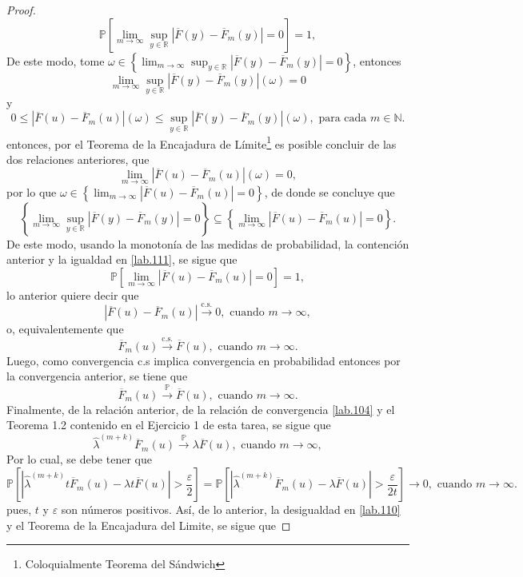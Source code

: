 \documentclass[10.5pt,notitlepage]{article}
\newcommand{\PP}{\mathbb{P}}
\newcommand{\RR}{\mathbb{R}}
\newcommand{\ee}{\varepsilon}
\newcommand{\NN}{\mathbb{N}}
\newcommand{\toPP}{\overset{\PP}{\to}}
\newcommand{\toCS}{\overset{\mathrm{c.s.}}{\to}}
\newcommand{\abs}[1]{\left\lvert #1 \right\rvert}
\newcommand{\corch}[1]{\left[ #1 \right]}
\newcommand{\kis}[1]{\left\{ #1 \right\}}
\theoremstyle{plain}
\begin{document}
\begin{proof}
\begin{equation}\label{lab.111}
\PP\corch{\lim_{m \to \infty}\sup_{y \in \RR}\abs{\overline{F}(y) - \overline{F}_{m}(y)} = 0}= 1,     
\end{equation}
De este modo, tome \(\omega \in \kis{\lim_{m \to \infty}\sup_{y \in \RR}\abs{\overline{F}(y) - \overline{F}_{m}(y)} = 0}\), entonces 
\[
\lim_{m \to \infty}\sup_{y \in \RR}\abs{\overline{F}(y) - \overline{F}_{m}(y)}(\omega) = 0
\]
y
\[
0 \leq \abs{\overline{F}(u) - \overline{F}_{m}(u)}(\omega) \leq \sup_{y \in \RR}\abs{\overline{F}(y) - \overline{F}_{m}(y)}(\omega), \text{ para cada } m \in \NN.
\]
entonces, por el Teorema de la Encajadura de Límite\footnote{Coloquialmente Teorema del Sándwich} es posible concluir de las dos relaciones anteriores, que 
\[
 \lim_{m \to \infty}\abs{\overline{F}(u) - \overline{F}_{m}(u)}(\omega) = 0,
\]
por lo que \(\omega \in \kis{ \lim_{m \to \infty}\abs{\overline{F}(u) - \overline{F}_{m}(u)} = 0}\), de donde se concluye que 
\[
\kis{\lim_{m \to \infty}\sup_{y \in \RR}\abs{\overline{F}(y) - \overline{F}_{m}(y)} = 0}\subseteq \kis{\lim_{m \to \infty}\abs{\overline{F}(u) - \overline{F}_{m}(u)} = 0}.
\]
De este modo, usando la monotonía de las medidas de probabilidad, la contención anterior y la igualdad en \eqref{lab.111}, se sigue que 
\[
\PP\corch{\lim_{m \to \infty}\abs{\overline{F}(u) - \overline{F}_{m}(u)} = 0} = 1, 
\]
lo anterior quiere decir que 
\[
\abs{\overline{F}(u) - \overline{F}_{m}(u)} \toCS 0, \text{ cuando } m \to \infty,
\]
o, equivalentemente que 
\[
 \overline{F}_{m}(u) \toCS \overline{F}(u),  \text{ cuando } m \to \infty.
\]
Luego, como convergencia c.s implica convergencia en probabilidad entonces por la convergencia anterior, se tiene que
\begin{equation}\label{lab.12}
   \overline{F}_{m}(u) \toPP \overline{F}(u),  \text{ cuando } m \to \infty.  
\end{equation}
 Finalmente, de la relación anterior, de la relación de convergencia \eqref{lab.104} y el Teorema 1.2 contenido en el Ejercicio 1 de esta tarea, se sigue que 
 \[
  \hat{\lambda}^{(m + k)}\overline{F}_{m}(u) \toPP \lambda\overline{F}(u), \text{ cuando } m \to \infty,
 \]
 Por lo cual, se debe tener que 
 \[
 \PP\corch{ \abs{ \hat{\lambda}^{(m + k)} t\overline{F}_{m}(u) - \lambda t \overline{F}(u)} > \frac{\ee}{2}} = \PP\corch{ \abs{ \hat{\lambda}^{(m + k)}\overline{F}_{m}(u) - \lambda\overline{F}(u)} > \frac{\ee}{2t}} \to 0, \text{ cuando } m \to \infty.
 \]
 pues, \(t\) y \(\ee\) son números positivos. Así, de lo anterior, la desigualdad en \eqref{lab.110} y el Teorema de la Encajadura del Limite, se sigue que 

\end{proof}
\end{document}
